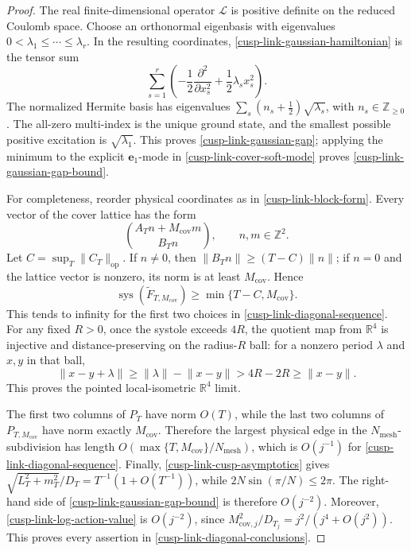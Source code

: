 \begin{proof}
The real finite-dimensional operator \(\mathcal L\) is positive definite on
the reduced Coulomb space.  Choose an orthonormal eigenbasis with eigenvalues
\(0<\lambda_1\leq\cdots\leq\lambda_r\).  In the resulting coordinates,
\eqref{cusp-link-gaussian-hamiltonian} is the tensor sum
\[
 \sum_{s=1}^r
 \left(-\frac12\frac{\partial^2}{\partial x_s^2}
       +\frac12\lambda_sx_s^2\right).
\]
The normalized Hermite basis has eigenvalues
\(\sum_s(n_s+\tfrac12)\sqrt{\lambda_s}\), with
\(n_s\in\mathbb Z_{\geq0}\).  The all-zero multi-index is the unique ground
state, and the smallest possible positive excitation is
\(\sqrt{\lambda_1}\).  This proves \eqref{cusp-link-gaussian-gap}; applying
the minimum to the explicit \(\mathbf e_1\)-mode in
\eqref{cusp-link-cover-soft-mode} proves
\eqref{cusp-link-gaussian-gap-bound}.

For completeness, reorder physical coordinates as in
\eqref{cusp-link-block-form}.  Every vector of the cover lattice has the
form
\[
 \binom{A_Tn+M_{\mathrm{cov}}m}{B_Tn},
 \qquad n,m\in\mathbb Z^2.
\]
Let \(C=\sup_T\lVert C_T\rVert_{\mathrm{op}}\).  If \(n\neq0\), then
\(\lVert B_Tn\rVert\geq(T-C)\lVert n\rVert\); if \(n=0\) and the lattice
vector is nonzero, its norm is at least \(M_{\mathrm{cov}}\).  Hence
\begin{equation}
 \operatorname{sys}(\widetilde F_{T,M_{\mathrm{cov}}})
 \geq\min\{T-C,M_{\mathrm{cov}}\}.
 \label{cusp-link-cover-systole-bound}
\end{equation}
This tends to infinity for the first two choices in
\eqref{cusp-link-diagonal-sequence}.  For any fixed \(R>0\), once the
systole exceeds \(4R\), the quotient map from \(\mathbb R^4\) is injective
and distance-preserving on the radius-\(R\) ball: for a nonzero period
\(\lambda\) and \(x,y\) in that ball,
\[
 \lVert x-y+\lambda\rVert
 \geq\lVert\lambda\rVert-\lVert x-y\rVert
 >4R-2R\geq\lVert x-y\rVert.
\]
This proves the pointed local-isometric \(\mathbb R^4\) limit.

The first two columns of \(P_T\) have norm \(O(T)\), while the last two
columns of \(P_{T,M_{\mathrm{cov}}}\) have norm exactly
\(M_{\mathrm{cov}}\).  Therefore the largest physical edge in the
\(N_{\mathrm{mesh}}\)-subdivision has length
\(O(\max\{T,M_{\mathrm{cov}}\}/N_{\mathrm{mesh}})\), which is \(O(j^{-1})\)
for \eqref{cusp-link-diagonal-sequence}.  Finally,
\eqref{cusp-link-cusp-asymptotics} gives
\(\sqrt{L_T^2+m_T^2}/D_T=T^{-1}(1+O(T^{-1}))\), while
\(2N\sin(\pi/N)\leq2\pi\).  The right-hand side of
\eqref{cusp-link-gaussian-gap-bound} is therefore \(O(j^{-2})\).
Moreover, \eqref{cusp-link-log-action-value} is \(O(j^{-2})\), since
\(M_{\mathrm{cov},j}^2/D_{T_j}=j^2/(j^4+O(j^2))\).
This proves every assertion in \eqref{cusp-link-diagonal-conclusions}.
\end{proof}

